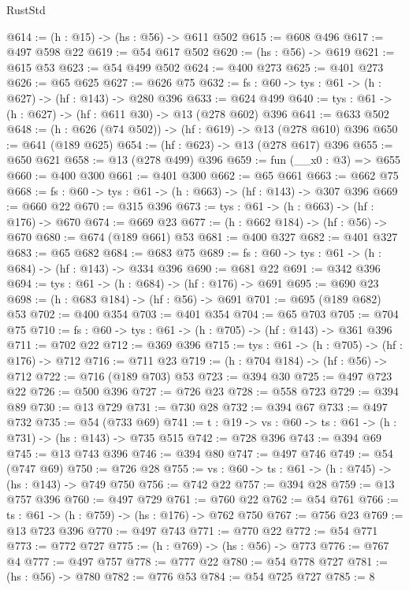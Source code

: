 \begin{lexlean}{RustStd}
\begin{coremodule}
{\begin{coremodule}
{{{{{{{{{{{{{{{{{{{{{{@614 := (h : @15) -> (hs : @56) -> @611 @502
@615 := @608 @496
@617 := @497 @598 @22
@619 := @54 @617 @502
@620 := (hs : @56) -> @619
@621 := @615 @53
@623 := @54 @499 @502
@624 := @400 @273
@625 := @401 @273
@626 := @65 @625
@627 := @626 @75
@632 := {fs : @60} -> {tys : @61} -> (h : @627) -> (hf : @143) -> @280 @396
@633 := @624 @499
@640 := {tys : @61} -> (h : @627) -> (hf : @611 @30) -> @13 (@278 @602) @396
@641 := @633 @502
@648 := (h : @626 (@74 @502)) -> (hf : @619) -> @13 (@278 @610) @396
@650 := @641 (@189 @625)
@654 := (hf : @623) -> @13 (@278 @617) @396
@655 := @650 @621
@658 := @13 (@278 @499) @396
@659 := fun (__x0 : @3) => @655
@660 := @400 @300
@661 := @401 @300
@662 := @65 @661
@663 := @662 @75
@668 := {fs : @60} -> {tys : @61} -> (h : @663) -> (hf : @143) -> @307 @396
@669 := @660 @22
@670 := @315 @396
@673 := {tys : @61} -> (h : @663) -> (hf : @176) -> @670
@674 := @669 @23
@677 := (h : @662 @184) -> (hf : @56) -> @670
@680 := @674 (@189 @661) @53
@681 := @400 @327
@682 := @401 @327
@683 := @65 @682
@684 := @683 @75
@689 := {fs : @60} -> {tys : @61} -> (h : @684) -> (hf : @143) -> @334 @396
@690 := @681 @22
@691 := @342 @396
@694 := {tys : @61} -> (h : @684) -> (hf : @176) -> @691
@695 := @690 @23
@698 := (h : @683 @184) -> (hf : @56) -> @691
@701 := @695 (@189 @682) @53
@702 := @400 @354
@703 := @401 @354
@704 := @65 @703
@705 := @704 @75
@710 := {fs : @60} -> {tys : @61} -> (h : @705) -> (hf : @143) -> @361 @396
@711 := @702 @22
@712 := @369 @396
@715 := {tys : @61} -> (h : @705) -> (hf : @176) -> @712
@716 := @711 @23
@719 := (h : @704 @184) -> (hf : @56) -> @712
@722 := @716 (@189 @703) @53
@723 := @394 @30
@725 := @497 @723 @22
@726 := @500 @396
@727 := @726 @23
@728 := @558 @723
@729 := @394 @89
@730 := @13 @729
@731 := @730 @28
@732 := @394 @67
@733 := @497 @732
@735 := @54 (@733 @69)
@741 := {t : @19} -> {vs : @60} -> {ts : @61} -> (h : @731) -> (hs : @143) -> @735 @515
@742 := @728 @396
@743 := @394 @69
@745 := @13 @743 @396
@746 := @394 @80
@747 := @497 @746
@749 := @54 (@747 @69)
@750 := @726 @28
@755 := {vs : @60} -> {ts : @61} -> (h : @745) -> (hs : @143) -> @749 @750
@756 := @742 @22
@757 := @394 @28
@759 := @13 @757 @396
@760 := @497 @729
@761 := @760 @22
@762 := @54 @761
@766 := {ts : @61} -> (h : @759) -> (hs : @176) -> @762 @750
@767 := @756 @23
@769 := @13 @723 @396
@770 := @497 @743
@771 := @770 @22
@772 := @54 @771
@773 := @772 @727
@775 := (h : @769) -> (hs : @56) -> @773
@776 := @767 @4
@777 := @497 @757
@778 := @777 @22
@780 := @54 @778 @727
@781 := (hs : @56) -> @780
@782 := @776 @53
@784 := @54 @725 @727
@785 := 8
}}}}}}}}}}}}}}}}}}}}}}
\end{coremodule}}
\end{coremodule}
\end{lexlean}
